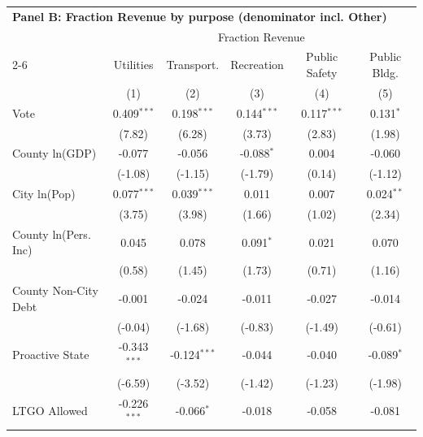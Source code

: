 \begingroup
\centering
\begin{tabular*}{\textwidth}{@{\extracolsep{\fill}}lccccc}
\multicolumn{6}{l}{\textbf{Panel B: Fraction Revenue by purpose (denominator incl. Other)}}\\
\addlinespace
   \toprule
    & \multicolumn{5}{c}{Fraction Revenue}\\
   \cmidrule(lr){2-6}
                               & Utilities      & Transport.     & Recreation    & Public Safety & Public Bldg. \\
                               & (1)            & (2)            & (3)           & (4)           & (5)\\
   \midrule
   Vote                        & 0.409$^{***}$  & 0.198$^{***}$  & 0.144$^{***}$ & 0.117$^{***}$ & 0.131$^{*}$\\
                               & (7.82)        & (6.28)        & (3.73)       & (2.83)       & (1.98)\\
   County ln(GDP)              & -0.077         & -0.056         & -0.088$^{*}$  & 0.004         & -0.060\\
                               & (-1.08)       & (-1.15)       & (-1.79)      & (0.14)       & (-1.12)\\
   City ln(Pop)                & 0.077$^{***}$  & 0.039$^{***}$  & 0.011         & 0.007         & 0.024$^{**}$\\
                               & (3.75)        & (3.98)        & (1.66)       & (1.02)       & (2.34)\\
   County ln(Pers. Inc)        & 0.045          & 0.078          & 0.091$^{*}$   & 0.021         & 0.070\\
                               & (0.58)        & (1.45)        & (1.73)       & (0.71)       & (1.16)\\
   County Non-City Debt        & -0.001         & -0.024         & -0.011        & -0.027        & -0.014\\
                               & (-0.04)       & (-1.68)       & (-0.83)      & (-1.49)      & (-0.61)\\
   Proactive State             & -0.343$^{***}$ & -0.124$^{***}$ & -0.044        & -0.040        & -0.089$^{*}$\\
                               & (-6.59)       & (-3.52)       & (-1.42)      & (-1.23)      & (-1.98)\\
   LTGO Allowed                & -0.226$^{***}$ & -0.066$^{*}$   & -0.018        & -0.058        & -0.081\\

\end{tabular*}
